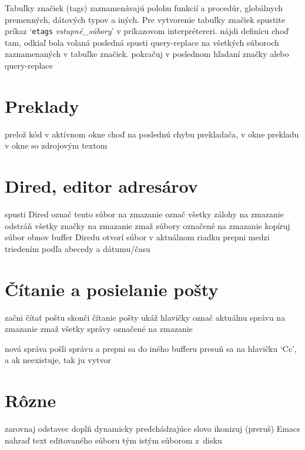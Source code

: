 Tabuľky značiek (tags) zaznamenávajú polohu funkcií a procedúr, globálnych
premenných, dátových typov a iných. Pre vytvorenie tabuľky značiek spustite
príkaz `{\tt etags} {\it vstupné\_súbory}' v príkazovom interprétereri.
\askip
{} nájdi definícu
 choď tam, odkiaľ bola volaná posledná 
 spusti query-replace na všetkých súboroch
zaznamenaných v tabuľke značiek.
 pokračuj v poslednom hľadaní značky alebo query-replace

\section{Preklady}

 prelož kód v aktívnom okne
 choď na poslednú chybu prekladača, v okne prekladu
 v okne so zdrojovým textom

\section{Dired, editor adresárov}

 spusti Dired
 označ tento súbor na zmazanie
\key{\~{}} označ všetky zálohy na zmazanie
 odstráň všetky značky na zmazanie
 zmaž súbory označené na zmazanie
 kopíruj súbor
 obnov buffer Diredu
 otvorí súbor v aktuálnom riadku
 prepni medzi triedením podľa abecedy a dátumu/času

\section{Čítanie a posielanie pošty}

 začni čítať poštu
 skonči čítanie pošty
 ukáž hlavičky
 označ aktuálnu správu na zmazanie
 zmaž všetky správy označené na zmazanie

 nová správa
 pošli správu a prepni sa do iného bufferu
 presuň sa na hlavičku `Cc', a ak neexistuje, tak ju
vytvor

\section{Rôzne}

 zarovnaj odstavec
 doplň dynamicky predchádzajúce slovo
 ikonizuj (preruš) Emacs
 nahraď text editovaného súboru tým istým súborom z~disku

